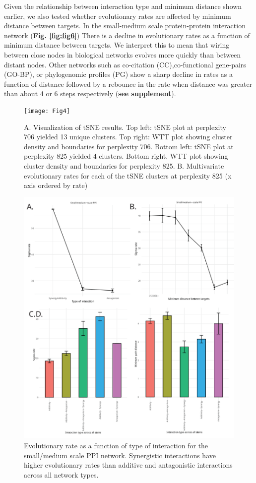 \documentclass[
]{article}
\begin{document}
Given the relationship between interaction type and minimum distance shown earlier, we also tested whether evolutionary rates are affected by minimum distance between targets. In the small-medium scale protein-protein interaction network (\textbf{Fig. \ref{fig:fig6}}) There is a decline in evolutionary rates as a function of minimum distance between targets. We interpret this to mean that wiring between close nodes in biological networks evolves more quickly than between distant nodes.
Other networks such as co-citation (CC),co-functional gene-pairs (GO-BP), or phylogenomic profiles (PG) show a sharp decline in rates as a function of distance followed by a rebounce in the rate when distance was greater than about 4 or 6 steps respectively (\textbf{see supplement}).

\begin{figure}
\texttt{[image: Fig4]} \caption{A. Visualization of tSNE results. Top left: tSNE plot at perplexity 706 yielded 13 unique clusters. Top right: WTT plot showing cluster density and boundaries for perplexity 706. Bottom left: tSNE plot at perplexity 825 yielded 4 clusters. Bottom right. WTT plot showing cluster density and boundaries for perplexity 825. B. Multivariate evolutionary rates for each of the tSNE clusters at perplexity 825 (x axis ordered by rate)}\label{fig:fig4}
\end{figure}

\begin{figure}
\includegraphics[width=1\linewidth]{Fig5} \caption{ Evolutionary rate as a function of type of interaction for the small/medium scale PPI network. Synergistic interactions have higher evolutionary rates than additive and antagonistic interactions across all network types.}\label{fig:fig5}
\end{figure}
\end{document}
